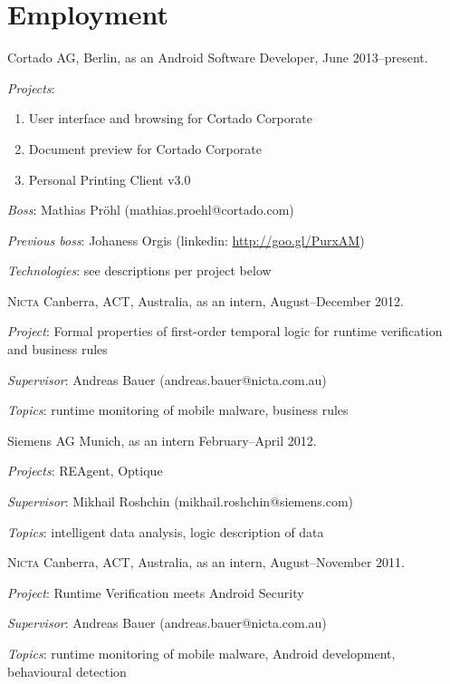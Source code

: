 \documentclass[letterpaper]{article}
\renewenvironment{itemize}{
  \begin{list}{}{
    \setlength{\leftmargin}{1.5em}
  }
}{
  \end{list}
}
\begin{document}
\section*{Employment}
\begin{itemize}
\item Cortado AG, Berlin, as an Android Software Developer, June 2013--present.
\begin{itemize}
      \item {\it Projects}: 
      \begin{enumerate}
          \item User interface and browsing for Cortado Corporate 
          \item Document preview for Cortado Corporate
          \item Personal Printing Client v3.0     
      \end{enumerate}
      \item {\it Boss}: Mathias Pr\"ohl (mathias.proehl@cortado.com)
      \item {\it Previous boss}: Johaness Orgis (linkedin: \url{http://goo.gl/PurxAM})
      \item {\it Technologies}: see descriptions per project below
\end{itemize}
\item \textsc{Nicta} Canberra, ACT, Australia, as an intern, August--December 2012. 
\begin{itemize}
      \item {\it Project}: Formal properties of first-order temporal logic for runtime verification and business rules
      \item {\it Supervisor}: Andreas Bauer (andreas.bauer@nicta.com.au)
      \item {\it Topics}: runtime monitoring of mobile malware, business rules
\end{itemize}
\item Siemens AG Munich, as an intern February--April 2012.
\begin{itemize}
      \item {\it Projects}: REAgent, Optique
	  \item {\it Supervisor}: Mikhail Roshchin (mikhail.roshchin@siemens.com)
	  \item {\it Topics}: intelligent data analysis, logic description of data
\end{itemize}
\item \textsc{Nicta} Canberra, ACT, Australia, as an intern, August--November 2011. 
\begin{itemize}
      \item {\it Project}: Runtime Verification meets Android Security
      \item {\it Supervisor}: Andreas Bauer (andreas.bauer@nicta.com.au)
      \item {\it Topics}: runtime monitoring of mobile malware, Android development, behavioural detection\end{itemize}
\end{itemize}
\end{document}
